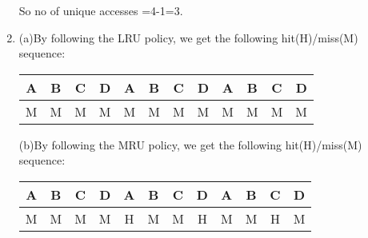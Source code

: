 \documentclass[12pt]{article}
\begin{document}
\begin{enumerate}
So no of unique accesses =4-1=3.\\
\item
(a)By following the LRU policy, we get the following hit(H)/miss(M) sequence: \\
\begin{center}
	\begin{tabular}{ |c|c|c|c|c|c|c|c|c|c|c|c| } 
		\hline
		A & B & C & D & A & B & C & D & A & B & C & D\\ 
		\hline
		M & M & M & M & M & M & M & M & M & M & M & M\\ 
		\hline
	\end{tabular}
\end{center}
(b)By following the MRU policy, we get the following hit(H)/miss(M) sequence:\\
\begin{center}
	\begin{tabular}{ |c|c|c|c|c|c|c|c|c|c|c|c| } 
		\hline
		A & B & C & D & A & B & C & D & A & B & C & D\\ 
		\hline
		M & M & M & M & H & M & M & H & M & M & H & M\\ 
		\hline
	\end{tabular}
\end{center}
	
\end{enumerate}
\end{document}
